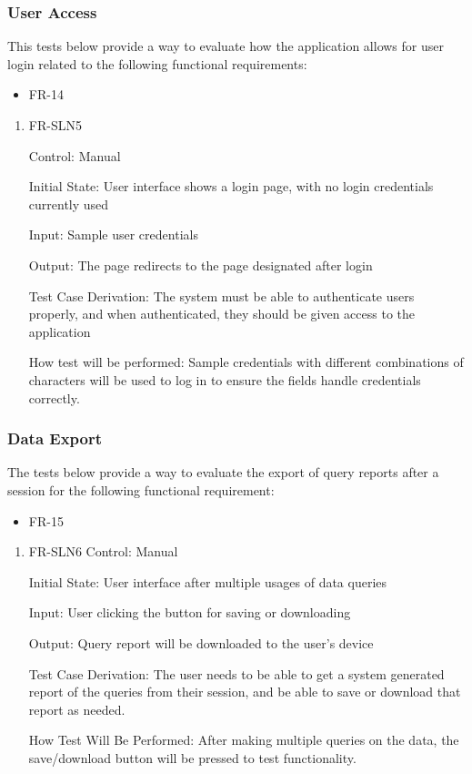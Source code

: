 \documentclass[12pt, titlepage]{article}
\begin{document}
          \subsubsection{User Access}
          This tests below provide a way to evaluate how the application allows for user login related to the following functional requirements:
          \begin{itemize}
            \item FR-14
          \end{itemize}
            \begin{enumerate}
            
              \item{FR-SLN5}
              
              Control: Manual
                        
              Initial State: User interface shows a login page, with no login credentials currently used
                        
              Input: Sample user credentials
                        
              Output: The page redirects to the page designated after login
              
              Test Case Derivation: The system must be able to authenticate users properly, and when authenticated, they should be given access to the application
                        
              How test will be performed: Sample credentials with different combinations of characters will be used to log in to ensure the fields handle credentials correctly.  
              
              \end{enumerate}

  \subsubsection{Data Export}
  The tests below provide a way to evaluate the export of query reports after a session for the following functional requirement:
  \begin{itemize}
    \item FR-15
  \end{itemize}
  \begin{enumerate}
    \item{FR-SLN6}
    Control: Manual

    Initial State: User interface after multiple usages of data queries

    Input: User clicking the button for saving or downloading

    Output: Query report will be downloaded to the user's device

    Test Case Derivation: The user needs to be able to get a system generated report of the queries from their session, and be able to save or download that report as needed.

    How Test Will Be Performed: After making multiple queries on the data, the save/download button will be pressed to test functionality.
  \end{enumerate}
\end{document}
